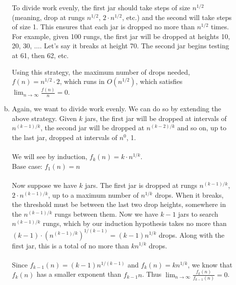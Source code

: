\documentclass[a4paper]{article}
\begin{document}
\begin{itemize}
\begin{enumerate}[a.]
To divide work evenly, the first jar should take steps of size $n^{1/2}$ (meaning, drop at rungs $n^{1/2}$, $2\cdot n^{1/2}$, etc.) and the second will take steps of size 1. This ensures that each jar is dropped no more than $n^{1/2}$ times. For example, given 100 rungs, the first jar will be dropped at heights 10, 20, 30, $\dots$. Let's say it breaks at height 70. The second jar begins testing at 61, then 62, etc. 

Using this strategy, the maximum number of drops needed, $f(n)=n^{1/2} \cdot 2$, which runs in $O(n^{1/2})$, which satisfies $\lim_{n \to \infty}{\frac{f(n)}{n}} = 0$. \\

\item Again, we want to divide work evenly. We can do so by extending the above strategy. Given $k$ jars, the first jar will be dropped at intervals of $n^{(k-1)/k}$, the second jar will be dropped at $n^{(k-2)/k}$ and so on, up to the last jar, dropped at intervals of $n^0$, 1.\\
\\
We will see by induction, $f_k(n) = k \cdot n^{1/k}$. \\
Base case: $f_1(n) = n$ \\
\\
Now suppose we have $k$ jars. The first jar is dropped at rungs $n^{(k-1)/k}$, $2 \cdot n^{(k-1)/k}$, up to a maximum number of $n^{1/k}$ drops. When it breaks, the threshold must be between the last two drop heights, somewhere in the $n^{(k-1)/k}$ rungs between them. Now we have $k-1$ jars to search $n^{(k-1)/k}$ rungs, which by our induction hypothesis takes no more than $(k-1) \cdot (n^{(k-1)/k})^{1/(k-1)} = (k-1)n^{1/k}$ drops. Along with the first jar, this is a total of no more than $kn^{1/k}$ drops.\\
\\
Since $f_{k-1}(n) = (k-1)n^{1/(k-1)}$ and $f_{k}(n) = kn^{1/k}$, we know that $f_{k}(n)$ has a smaller exponent than $f_{k-1}{n}$. Thus $\lim_{n \to \infty}{\frac{f_k(n)}{f_{k-1}(n)}} = 0$. \\

\end{enumerate}

\end{itemize}
\end{document}
